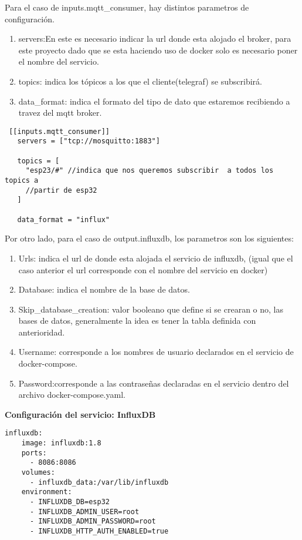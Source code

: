 Para el caso de inputs.mqtt\_consumer, hay distintos parametros de
configuración.
\begin{enumerate}
  \item servers:En este es necesario indicar la url donde esta alojado el
    broker, para este proyecto dado que se esta haciendo uso de docker solo es
    necesario poner el nombre del servicio. 
  \item topics: indica los tópicos a los que el cliente(telegraf) se
    subscribirá. 
  \item data\_format: indica el formato del tipo de dato que estaremos
    recibiendo a travez del mqtt broker. 
\end{enumerate}
\begin{verbatim}
 [[inputs.mqtt_consumer]]
   servers = ["tcp://mosquitto:1883"] 

   topics = [
     "esp23/#" //indica que nos queremos subscribir  a todos los topics a
     //partir de esp32
   ]

   data_format = "influx" 
\end{verbatim}

Por otro lado, para el caso de output.influxdb, los parametros son los
siguientes:
\begin{enumerate}
  \item Urls: indica el url de donde esta alojada el servicio de influxdb,
    (igual que el caso anterior el url corresponde con el nombre del servicio
    en docker)
  \item Database: indica el nombre de la base de datos. 
  \item Skip\_database\_creation: valor booleano que define si se crearan o no,
    las bases de datos, generalmente la idea es tener la tabla definida con
    anterioridad. 
  \item Username: corresponde a los nombres de usuario declarados en el
    servicio de docker-compose. 
  \item Password:corresponde a las contraseñas declaradas en el
    servicio dentro del archivo docker-compose.yaml.
\end{enumerate}



\begin{flushleft}
  \textbf{Configuración del servicio: InfluxDB}
\end{flushleft}

\begin{verbatim}
influxdb: 
    image: influxdb:1.8 
    ports:
      - 8086:8086 
    volumes:
      - influxdb_data:/var/lib/influxdb 
    environment:
      - INFLUXDB_DB=esp32 
      - INFLUXDB_ADMIN_USER=root 
      - INFLUXDB_ADMIN_PASSWORD=root 
      - INFLUXDB_HTTP_AUTH_ENABLED=true 
\end{verbatim}


